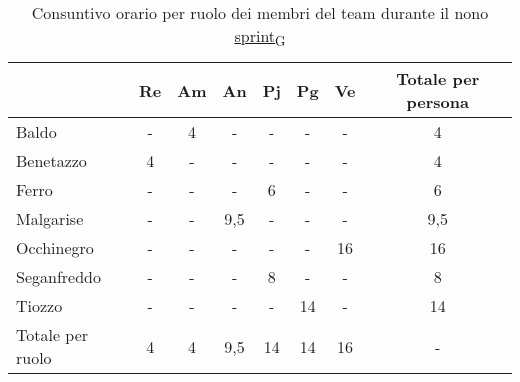 \begin{table}[!h]
    \centering
    \begin{tabular}{ | l | c | c | c | c | c | c | c | }
        \hline
		\textbf{} & \textbf{Re} & \textbf{Am} &\textbf{An} & \textbf{Pj} & \textbf{Pg} & \textbf{Ve} & \textbf{Totale per persona} \\
		\hline			    %
		Baldo            &  -   &  4   &  -   &  -   &  -   &  -   &  4   \\
		Benetazzo        &  4   &  -   &  -   &  -   &  -   &  -   &  4   \\
		Ferro            &  -   &  -   &  -   &  6   &  -   &  -   &  6   \\
		Malgarise        &  -   &  -   &  9,5 &  -   &  -   &  -   &  9,5 \\
		Occhinegro       &  -   &  -   &  -   &  -   &  -   & 16   & 16   \\
		Seganfreddo      &  -   &  -   &  -   &  8   &  -   &  -   &  8   \\
		Tiozzo           &  -   &  -   &  -   &  -   & 14   &  -   & 14   \\
		\hline
		Totale per ruolo &  4   &  4   &  9,5 & 14   & 14   & 16   &  -   \\
		\hline
    \end{tabular}
    \caption{Consuntivo orario per ruolo dei membri del team durante il nono \href{https://7last.github.io/docs/rtb/documentazione-interna/glossario\#sprint}{sprint\textsubscript{G}}}
\end{table}

